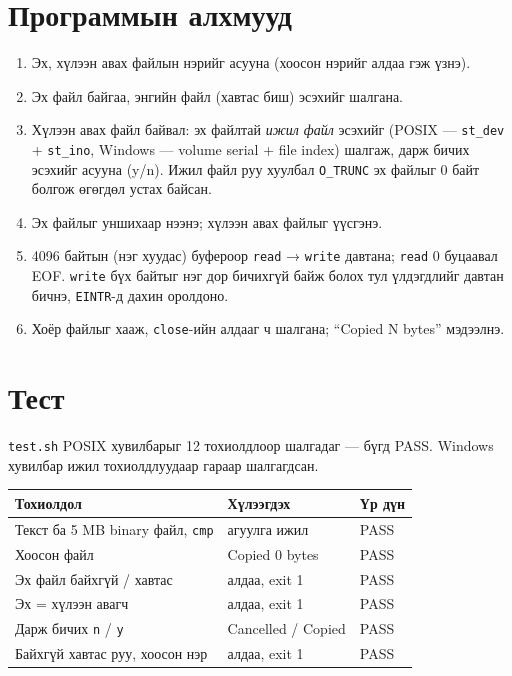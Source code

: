 \documentclass[12pt,a4paper]{article}
\begin{document}
\section{Программын алхмууд}
\begin{enumerate}[leftmargin=1.5em]
  \item Эх, хүлээн авах файлын нэрийг асууна (хоосон нэрийг алдаа гэж үзнэ).
  \item Эх файл байгаа, энгийн файл (хавтас биш) эсэхийг шалгана.
  \item Хүлээн авах файл байвал: эх файлтай \emph{ижил файл} эсэхийг (POSIX — \texttt{st\_dev} + \texttt{st\_ino}, Windows — volume serial + file index) шалгаж, дарж бичих эсэхийг асууна (y/n). Ижил файл руу хуулбал \texttt{O\_TRUNC} эх файлыг 0 байт болгож өгөгдөл устах байсан.
  \item Эх файлыг уншихаар нээнэ; хүлээн авах файлыг үүсгэнэ.
  \item 4096 байтын (нэг хуудас) буфероор \texttt{read} → \texttt{write} давтана; \texttt{read} 0 буцаавал EOF. \texttt{write} бүх байтыг нэг дор бичихгүй байж болох тул үлдэгдлийг давтан бичнэ, \texttt{EINTR}-д дахин оролдоно.
  \item Хоёр файлыг хааж, \texttt{close}-ийн алдааг ч шалгана; “Copied N bytes” мэдээлнэ.
\end{enumerate}

\section{Тест}
\texttt{test.sh} POSIX хувилбарыг 12 тохиолдлоор шалгадаг — бүгд PASS. Windows хувилбар ижил тохиолдлуудаар гараар шалгагдсан.
\begin{center}
\begin{tabular}{lll}
\toprule
Тохиолдол & Хүлээгдэх & Үр дүн\\
\midrule
Текст ба 5 MB binary файл, \texttt{cmp} & агуулга ижил & PASS\\
Хоосон файл & Copied 0 bytes & PASS\\
Эх файл байхгүй / хавтас & алдаа, exit 1 & PASS\\
Эх = хүлээн авагч & алдаа, exit 1 & PASS\\
Дарж бичих \texttt{n} / \texttt{y} & Cancelled / Copied & PASS\\
Байхгүй хавтас руу, хоосон нэр & алдаа, exit 1 & PASS\\
\bottomrule
\end{tabular}
\end{center}
\end{document}
